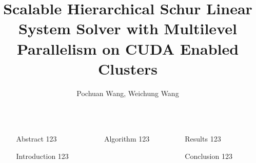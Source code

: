 \documentclass[final]{beamer}
\title{Scalable Hierarchical Schur Linear System Solver with Multilevel Parallelism on CUDA Enabled Clusters}
\author{Pochuan Wang, Weichung Wang}
\institute{Institute of Applied Mathematical Sciences, National Taiwan University}
\newlength{\sepwid}
\newlength{\onecolwid}
\begin{document}
  \begin{frame}[t]
    \begin{columns}[t]
      \begin{column}{\sepwid}\end{column}
        \begin{column}{\onecolwid}
        \begin{block}{Abstract}
          123
        \end{block}
        \begin{block}{Introduction}
          123
        \end{block}
      \end{column}

      \begin{column}{\sepwid}\end{column}

      \begin{column}{\onecolwid}
        \begin{block}{Algorithm}
          123
        \end{block}
      \end{column}
      
      \begin{column}{\sepwid}\end{column}
      
      \begin{column}{\onecolwid}
        \begin{block}{Results}
          123
        \end{block}
        \begin{block}{Conclusion}
          123
        \end{block}
      \end{column}

      \begin{column}{\sepwid}\end{column}
    \end{columns}
  \end{frame}
\end{document}
